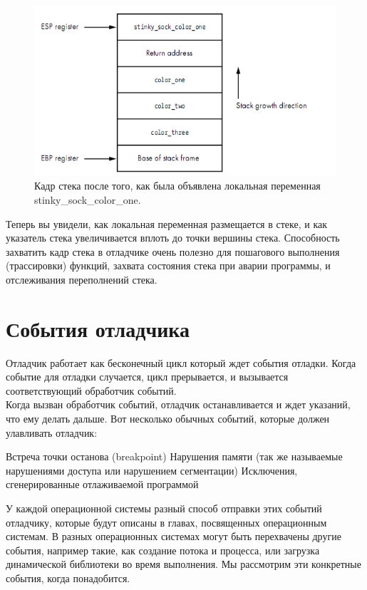 \documentclass[12pt, a4paper, oneside]{book}
\begin{document}
\begin{figure}
  \center
  \includegraphics{./pic/chap2/2.PNG}
  \caption{Кадр стека после того, как была объявлена локальная переменная stinky\_sock\_color\_one.}
\end{figure}

Теперь вы увидели, как локальная переменная размещается в стеке, и как указатель стека увеличивается вплоть до точки вершины стека. Способность захватить кадр стека в отладчике очень полезно для пошагового выполнения (трассировки) функций, захвата состояния стека при аварии программы, и отслеживания переполнений стека.\\

\section{События отладчика}

Отладчик работает как бесконечный цикл который ждет события отладки. Когда событие для отладки случается, цикл прерывается, и вызывается соответствующий обработчик событий.\\

Когда вызван обработчик событий, отладчик останавливается и ждет указаний, что ему делать дальше. Вот несколько обычных событий, которые должен улавливать отладчик:

    Встреча точки останова (breakpoint)
    Нарушения памяти (так же называемые нарушениями доступа или нарушением сегментации)
    Исключения, сгенерированные отлаживаемой программой


У каждой операционной системы разный способ отправки этих событий отладчику, которые будут описаны в главах, посвященных операционным системам. В разных операционных системах могут быть перехвачены другие события, например такие, как создание потока и процесса, или загрузка динамической библиотеки во время выполнения. Мы рассмотрим эти конкретные события, когда понадобится.\\
\end{document}
